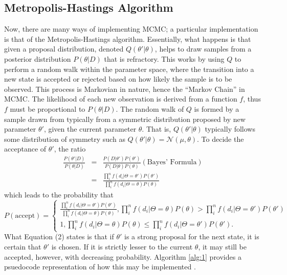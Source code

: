 \documentclass[11pt]{article}
\theoremstyle{definition}
\begin{document}
\subsection{Metropolis-Hastings Algorithm}
Now, there are many ways of implementing MCMC; a particular implementation is that of the Metropolis-Hastings algorithm. Essentially, what happens is that given a proposal distribution, denoted $Q(\theta'|\theta)$, helps to draw samples from a posterior distribution $P(\theta|D)$ that is refractory. This works by using $Q$ to perform a random walk within the parameter space, where the transition into a new state is accepted or rejected based on how likely the sample is to be observed. This process is Markovian in nature, hence the ``Markov Chain'' in MCMC. The likelihood of each new observation is derived from a function $f$, thus $f$ must be proportional to $P(\theta|D)$. The random walk of $Q$ is formed by a sample drawn from typically from a symmetric distribution proposed by new parameter $\theta'$, given the current parameter $\theta$. That is, $Q(\theta'|\theta)$ typically follows some distribution of symmetry such as $Q(\theta'|\theta)=\mathcal{N}(\mu,\theta)$. To decide the acceptance of $\theta'$, the ratio 
\begin{eqnarray*}
    \frac{P(\theta'|D)}{P(\theta|D)}&=&\frac{P(D|\theta')P(\theta')}{P(D|\theta)P(\theta)} (\text{Bayes' Formula})\\
                                    &=&\frac{\prod_{i}^{n}f(d_i|\Theta=\theta')P(\theta')}{\prod_{i}^{n}f(d_i|\Theta=\theta)P(\theta)}
\end{eqnarray*}
which leads to the probability that 
\begin{equation}
    P(\text{accept})=
    \begin{cases}
        \frac{\prod_{i}^{n}f(d_i|\Theta=\theta')P(\theta')}{\prod_{i}^{n}f(d_i|\Theta=\theta)P(\theta)}, \prod_{i}^{n}f(d_i|\Theta=\theta)P(\theta) > \prod_{i}^{n}f(d_i|\Theta=\theta')P(\theta')\\
        1, \prod_{i}^{n}f(d_i|\Theta=\theta)P(\theta) \leq \prod_{i}^{n}f(d_i|\Theta=\theta')P(\theta').
    \end{cases}
\end{equation}
What Equation (2) states is that if $\theta'$ is a strong proposal for the next state, it is certain that $\theta'$ is chosen. If it is strictly lesser to the current $\theta$, it may still be accepted, however, with decreasing probability. Algorithm \ref{alg:1} provides a psuedocode representation of how this may be implemented \cite{Book_MonteCarlo_2004_Robert_MonteCarloStatisticalMethods}.
\end{document}
